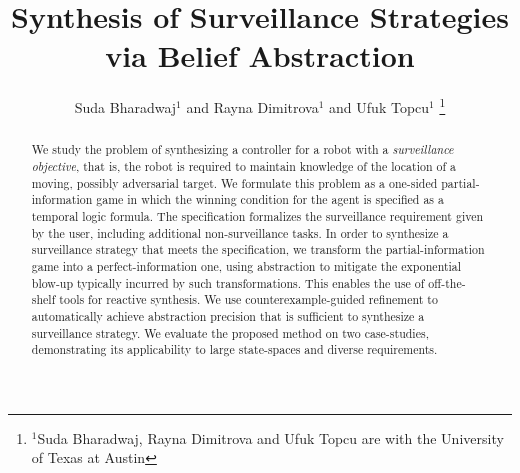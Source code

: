\documentclass[letterpaper, 10 pt, conference]{ieeeconf}  %
\title{\LARGE \bf Synthesis of Surveillance Strategies via Belief Abstraction}
\author{Suda Bharadwaj$^{1}$ and Rayna Dimitrova$^{1}$ and Ufuk Topcu$^{1}$%
\thanks{$^{1}$Suda Bharadwaj, Rayna Dimitrova and Ufuk Topcu are with the University of Texas at Austin}%
}
\begin{document}
\maketitle
\thispagestyle{empty}
\pagestyle{empty}


\begin{abstract}
We study the problem of synthesizing a controller for a robot with a \emph{surveillance objective}, that is, the robot is required to  maintain knowledge of the location of a moving, possibly adversarial target. We formulate this problem as a one-sided partial-information  game in which the winning condition for the agent is specified as a temporal logic formula. The specification formalizes the surveillance requirement given by the user, including additional non-surveillance tasks. In order to synthesize a surveillance strategy that meets the specification, we transform the partial-information game into a perfect-information one, using abstraction to mitigate the exponential blow-up typically incurred by such transformations. This enables the use of off-the-shelf tools for reactive synthesis. We use counterexample-guided refinement to automatically achieve abstraction precision that is sufficient to synthesize a surveillance strategy. We evaluate the proposed method on two case-studies, demonstrating its applicability to large state-spaces and diverse requirements.




\end{abstract}
\end{document}
